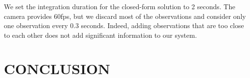 \documentclass[letterpaper, 10 pt, conference]{ieeeconf}  %
\begin{document}
We set the integration duration for the closed-form solution to 2 seconds.
The camera provides 60fps, but we discard most of the observations and consider only one observation every 0.3 seconds.
Indeed, adding observations that are too close to each other does not add significant information to our system.





\section{CONCLUSION}




\end{document}
